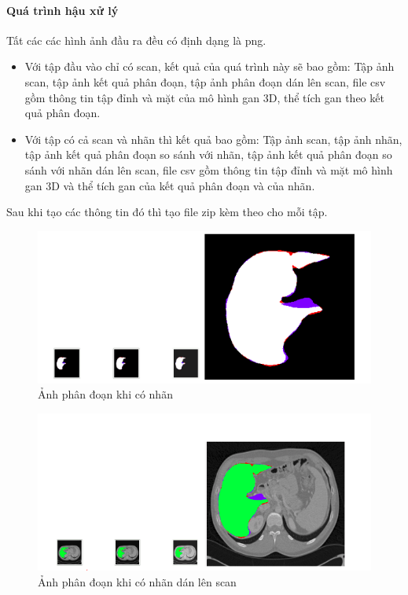 \paragraph{Quá trình hậu xử lý\\}
Tất các các hình ảnh đầu ra đều có định dạng là png.
\begin{itemize}
    \item Với tập đầu vào chỉ có scan, kết quả của quá trình này sẽ bao gồm: Tập ảnh scan, tập ảnh kết quả phân đoạn, tập ảnh phân đoạn dán lên scan, file csv gồm thông tin tập đỉnh và mặt của mô hình gan 3D, thể tích gan theo kết quả phân đoạn.
    \item Với tập có cả scan và nhãn thì kết quả bao gồm: Tập ảnh scan, tập ảnh nhãn, tập ảnh kết quả phân đoạn so sánh với nhãn,  tập ảnh kết quả phân đoạn so sánh với nhãn dán lên scan, file csv gồm thông tin tập đỉnh và mặt mô hình gan 3D và thể tích gan của kết quả phân đoạn và của nhãn.
\end{itemize}
Sau khi tạo các thông tin đó thì tạo file zip kèm theo cho mỗi tập.
\begin{figure}[h]
\centering
    \includegraphics[totalheight=7cm]{Images/app_scancompare.png}
    \caption{Ảnh phân đoạn khi có nhãn}
    \label{skip_conn}
\end{figure}
\begin{figure}[h]
\centering
    \includegraphics[totalheight=7cm]{Images/app_scanoverlap.png}
    \caption{Ảnh phân đoạn khi có nhãn dán lên scan}
    \label{skip_conn}
\end{figure}
